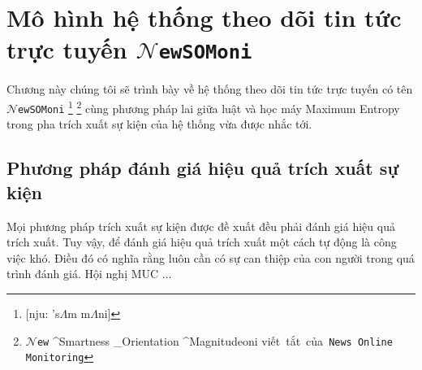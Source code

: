
\chapter{Mô hình hệ thống theo dõi tin tức trực tuyến $\mathcal{N}$\texttt{ewSOMoni}} %



\ifpdf
    \graphicspath{{3/figures/PNG/}{3/figures/PDF/}{3/figures/}}
\else
    \graphicspath{{3/figures/EPS/}{3/figures/}}
\fi



\noindent Chương này chúng tôi sẽ trình bày về hệ thống theo dõi tin tức trực tuyến có tên $\mathcal{N}$\texttt{ewSOMoni}
\footnote{[nju: 's$\Lambda$m m$\Lambda$ni]} \footnote{$\mathcal{N}$\texttt{ew} ^{\mbox{Smartness}} _{\mbox{Orientation}} ^{\mbox{Magnitude}}oni \hspace{0.2in}   \mbox{viết tắt của \texttt{News Online Monitoring}}} cùng  phương pháp lai giữa luật và học máy Maximum Entropy trong pha trích xuất sự kiện của hệ thống vừa được nhắc tới. %


\section{Phương pháp đánh giá hiệu quả trích xuất sự kiện}
\noindent Mọi phương pháp trích xuất sự kiện được đề xuất đều phải đánh giá hiệu quả trích xuất. Tuy vậy, để đánh giá hiệu quả trích xuất một cách tự động là công việc khó. Điều đó có nghĩa rằng luôn cần có sự can thiệp của con người trong quá trình đánh giá. Hội nghị MUC ...


